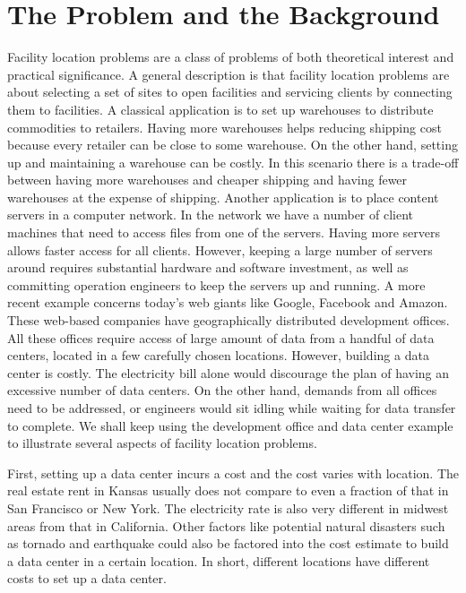 \documentclass[oneside,final]{ucr}
\begin{document}
\section{The Problem and the Background}
Facility location problems are a class of problems of both
theoretical interest and practical significance. A general
description is that facility location problems are about
selecting a set of sites to open facilities and servicing
clients by connecting them to facilities. A classical
application is to set up warehouses to distribute
commodities to retailers.  Having more warehouses helps
reducing shipping cost because every retailer can be close
to some warehouse. On the other hand, setting up and
maintaining a warehouse can be costly. In this scenario
there is a trade-off between having more warehouses and
cheaper shipping and having fewer warehouses at the expense
of shipping. Another application is to place content servers
in a computer network. In the network we have a number of
client machines that need to access files from one of the
servers. Having more servers allows faster access for all
clients. However, keeping a large number of servers around
requires substantial hardware and software investment, as
well as committing operation engineers to keep the servers
up and running. A more recent example concerns today's web
giants like Google, Facebook and Amazon. These web-based
companies have geographically distributed development
offices. All these offices require access of large amount of
data from a handful of data centers, located in a few
carefully chosen locations. However, building a data center
is costly. The electricity bill alone would discourage the
plan of having an excessive number of data centers. On the
other hand, demands from all offices need to be addressed,
or engineers would sit idling while waiting for data transfer
to complete. We shall keep using the development office and
data center example to illustrate several aspects of
facility location problems.

First, setting up a data center incurs a cost and the cost
varies with location. The real estate rent in Kansas usually
does not compare to even a fraction of that in San Francisco
or New York. The electricity rate is also very different in
midwest areas from that in California. Other factors like
potential natural disasters such as tornado and earthquake
could also be factored into the cost estimate to build a
data center in a certain location. In short, different
locations have different costs to set up a data center.
\end{document}
